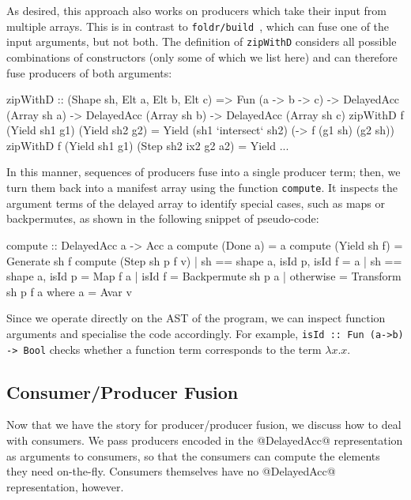 As desired, this approach also works on producers which\linebreak
take their input from multiple arrays. This is in contrast to\linebreak
\texttt{foldr/build}~\cite{Gill:1993de}, which
can fuse one of the input arguments, but not both. The definition of \texttt{zipWithD} considers 
all possible combinations of constructors (only some of which we list here) and can therefore fuse producers of both arguments:
%
\begin{code}
  zipWithD :: (Shape sh, Elt a, Elt b, Elt c)
           => Fun (a -> b -> c)
           -> DelayedAcc (Array sh a)
           -> DelayedAcc (Array sh b)
           -> DelayedAcc (Array sh c)
  zipWithD f (Yield sh1 g1) (Yield sh2 g2)
    = Yield (sh1 `intersect` sh2)
            (\sh -> f (g1 sh) (g2 sh))
  zipWithD f (Yield sh1 g1) (Step  sh2 ix2 g2 a2)
    = Yield ...
\end{code}
%
In this manner, sequences of producers fuse into a single producer term; then, we turn them back into a manifest array using the function \texttt{compute}. It inspects the argument terms of the delayed array to identify special cases, such as maps or backpermutes, as shown in the following snippet of pseudo-code:
%
\begin{code}
  compute :: DelayedAcc a -> Acc a
  compute (Done a)          = a
  compute (Yield sh f)      = Generate sh f
  compute (Step sh p f v)
    | sh == shape a, isId p, isId f 
                            = a
    | sh == shape a, isId p = Map f a
    | isId f                = Backpermute sh p a
    | otherwise             = Transform sh p f a
    where a = Avar v
\end{code}
%
Since we operate directly on the AST of the program, we can inspect function arguments and specialise the code accordingly. For example, \texttt{isId :: Fun (a->b) -> Bool} checks whether a function term corresponds to the term $\lambda x. x$. 


\subsection{Consumer/Producer Fusion}
Now that we have the story for producer/producer fusion, we discuss how to deal with consumers. We pass producers encoded in the @DelayedAcc@ representation as arguments to consumers, so that the consumers can compute the elements they need on-the-fly. Consumers themselves have no @DelayedAcc@ representation, however.

